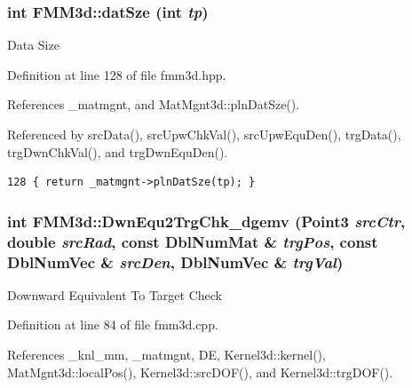 \subsubsection{\setlength{\rightskip}{0pt plus 5cm}int FMM3d::dat\-Sze (int {\em tp})\hspace{0.3cm}{\tt  [inline, protected]}}\label{classFMM3d_e698f5e6e784c12d19a62b0d40456fc6_e698f5e6e784c12d19a62b0d40456fc6}


Data Size 

Definition at line 128 of file fmm3d.hpp.

References \_\-matmgnt, and Mat\-Mgnt3d::pln\-Dat\-Sze().

Referenced by src\-Data(), src\-Upw\-Chk\-Val(), src\-Upw\-Equ\-Den(), trg\-Data(), trg\-Dwn\-Chk\-Val(), and trg\-Dwn\-Equ\-Den().

\footnotesize\begin{verbatim}128 { return _matmgnt->plnDatSze(tp); }
\end{verbatim}\normalsize 


\subsubsection{\setlength{\rightskip}{0pt plus 5cm}int FMM3d::Dwn\-Equ2Trg\-Chk\_\-dgemv (Point3 {\em src\-Ctr}, double {\em src\-Rad}, const Dbl\-Num\-Mat \& {\em trg\-Pos}, const Dbl\-Num\-Vec \& {\em src\-Den}, Dbl\-Num\-Vec \& {\em trg\-Val})\hspace{0.3cm}{\tt  [protected]}}\label{classFMM3d_044a9a8966c365ba77585ecc38a2073e_044a9a8966c365ba77585ecc38a2073e}


Downward Equivalent To Target Check 

Definition at line 84 of file fmm3d.cpp.

References \_\-knl\_\-mm, \_\-matmgnt, DE, Kernel3d::kernel(), Mat\-Mgnt3d::local\-Pos(), Kernel3d::src\-DOF(), and Kernel3d::trg\-DOF().

